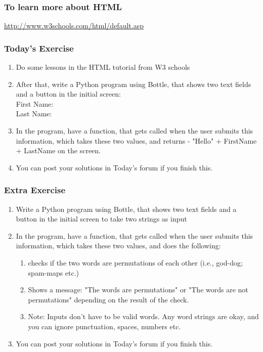 \documentclass{beamer}
\begin{document}
\begin{frame}
\frametitle{To learn more about HTML}
\url{http://www.w3schools.com/html/default.asp}	
\end{frame}

\begin{frame}
\frametitle{Today's Exercise}
\begin{enumerate}
\item Do some lessons in the HTML tutorial from W3 schools
\item After that, write a Python program using Bottle, that shows two text fields and a button in the initial screen:
\\ First Name:
\\ Last Name:
\item In the program, have a function, that gets called when the user submits this information, which takes these two values, and returns - "Hello" + FirstName + LastName on the screen. 
\item You can post your solutions in Today's forum if you finish this. 
\end{enumerate}
\end{frame}

\begin{frame}
\frametitle{Extra Exercise}
\begin{enumerate}
\item Write a Python program using Bottle, that shows two text fields and a button in the initial screen to take two strings as input
\item In the program, have a function, that gets called when the user submits this information, which takes these two values, and does the following:
\begin{enumerate}
\item checks if the two words are permutations of each other (i.e., god-dog; spam-maps etc.)
\item Shows a message: "The words are permutations" or "The words are not permutations" depending on the result of the check.
\item Note: Inputs don't have to be valid words. Any word strings are okay, and you can ignore punctuation, spaces, numbers etc. 
\end{enumerate}
\item You can post your solutions in Today's forum if you finish this. 
\end{enumerate}
\end{frame}
\end{document}
